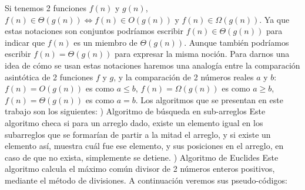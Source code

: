\documentclass[12pt,twoside]{article}
\begin{document}
\newline
Si tenemos 2 funciones $f(n)$ y $g(n)$, $f(n) \in \Theta(g(n)) \Longleftrightarrow f(n) \in O(g(n))$ y $f(n) \in \Omega(g(n))$. 
\newline
\newline
Ya que estas notaciones son conjuntos podr\'iamos escribir $f(n) \in \Theta(g(n))$ para indicar que $f(n)$ es un miembro de $\Theta(g(n))$. Aunque tambi\'en podr\'iamos escribir $f(n) = \Theta(g(n))$ para expresar la misma noci\'on.
\newline
\newline
Para darnos una idea de c\'omo se usan estas notaciones haremos una analog\'ia entre la comparaci\'on asint\'otica de 2 funciones $f$ y $g$, y la comparaci\'on de 2 n\'umeros reales $a$ y $b$:
\newline
$f(n) = O(g(n))$ es como $a \le b$,
\newline
$f(n) = \Omega(g(n))$ es como $a \ge b$,
\newline
$f(n) = \Theta(g(n))$ es como $a = b$.
\newline
\newline
Los algoritmos que se presentan en este trabajo son los siguientes:
\newline
{}) Algoritmo de b\'usqueda en sub-arreglos 
\newline
Este algoritmo checa si para un arreglo dado, existe un elemento igual en los subarreglos que se formar\'ian de partir a la mitad el arreglo, y si existe un elemento as\'i, muestra cu\'al fue ese elemento, y sus posiciones en el arreglo, en caso de que no exista, simplemente se detiene.
\newline
{}) Algoritmo de Euclides
\newline
Este algoritmo calcula el m\'aximo com\'un divisor de 2 n\'umeros enteros positivos, mediante el m\'etodo de divisiones.
\newline
\newline
A continuaci\'on veremos sus pseudo-c\'odigos:
\end{document}
